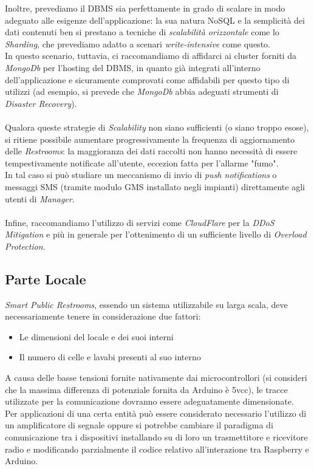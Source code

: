 \documentclass[12pt]{article}
\begin{document}
Inoltre, prevediamo il DBMS sia perfettamente in grado di scalare in modo adeguato alle esigenze dell'applicazione: la sua natura NoSQL e la semplicità dei dati contenuti ben si prestano a tecniche di \textit{scalabilità orizzontale} come lo \textit{Sharding}, che prevediamo adatto a scenari \textit{write-intensive} come questo.\\
In questo scenario, tuttavia, ci raccomandiamo di affidarci ai cluster  forniti da \textit{MongoDb} per l'hosting del DBMS, in quanto già integrati all'interno dell'applicazione e sicuramente comprovati come affidabili per questo tipo di utilizzi (ad esempio, si prevede che \textit{MongoDb} abbia adeguati strumenti di \textit{Disaster Recovery}).\\\\
Qualora queste strategie di \textit{Scalability} non siano sufficienti (o siano troppo esose), si ritiene possibile aumentare progressivamente la frequenza di aggiornamento delle \textit{Restrooms}: la maggioranza dei dati raccolti non hanno necessità di essere tempestivamente notificate all'utente, eccezion fatta per l'allarme "fumo".\\ 
In tal caso si può studiare un meccanismo di invio di \textit{push notifications} o messaggi SMS (tramite modulo GMS installato negli impianti) direttamente agli utenti di \textit{Manager}.\\\\
Infine, raccomandiamo l'utilizzo di servizi come \textit{CloudFlare} per la \textit{DDoS Mitigation} e più in generale per l'ottenimento di un sufficiente livello di \textit{Overload Protection}.
\newpage

\subsection{Parte Locale}
\textit{Smart Public Restrooms}, essendo un sistema utilizzabile su larga scala, deve necessariamente tenere in considerazione due fattori:
\begin{itemize}
\item Le dimensioni del locale e dei suoi interni
\item Il numero di celle e lavabi presenti al suo interno
\end{itemize}
A causa delle basse tensioni fornite nativamente dai microcontrollori (si consideri che la massima differenza di potenziale fornita da Arduino è 5vcc), le tracce utilizzate per la comunicazione dovranno essere adeguatamente dimensionate.\\
Per applicazioni di una certa entità può essere considerato necessario l'utilizzo di un amplificatore di segnale oppure si potrebbe cambiare il paradigma di comunicazione tra i dispositivi installando su di loro un trasmettitore e ricevitore radio e modificando parzialmente il codice relativo all'interazione tra Raspberry e Arduino.\\
\end{document}
